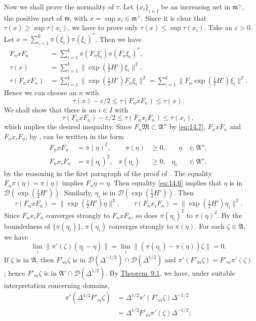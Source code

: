 \documentclass[12pt,b5paper,twoside]{article}
\theoremstyle{takesaki}
\numberwithin{equation}{section}
\begin{document}
Now we shall prove the normality of $\tau$.  Let $\{x_i\}_{i\in I}$
be an increasing net in $\mathfrak m^+$, the positive part of
$\mathfrak m$, with $x=\sup x_i\in\mathfrak m^+$.  Since it is clear
that $\tau(x)\geq\sup\tau(x_i)$, we have to prove only
$\tau(x)\leq\sup\tau(x_i)$.  Take an $\varepsilon>0$.  Let
$x=\sum_{i=1}^{k}\pi(\xi_i)\pi(\xi_i)^*$.  Then we have
\begin{align*}
 F_nxF_n&=\sum_{i=1}^{k}\pi(F_n\xi_i)\pi(F_n\xi_i)^*,\\
 \tau(x)&=\sum_{i=1}^{k}\|\exp(\tfrac12H')\xi_i\|^2,\\
 \tau(F_nxF_n)
 &=\sum_{i=1}^{k}\|\exp(\tfrac12H')F_n\xi_i\|^2
  =\sum_{i=1}^{k}\|F_n\exp(\tfrac12H')\xi_i\|^2.
\end{align*}
Hence we can choose an $n$ with
\[
  \tau(x)-\varepsilon/2\leq\tau(F_nxF_n)\leq\tau(x).
\]
We shall show that there is an $i\in I$ with
\[
 \tau(F_nxF_n)-\varepsilon/2
 \leq\tau(F_nx_iF_n)\leq\tau(x_i),
\]
which implies the desired inequality.  Since
$F_n\mathfrak M\subset\mathfrak A''$ by \eqref{eq:14.7},
$F_nxF_n$ and $F_nx_iF_n$, by , can be
written in the form
\[
 \begin{aligned}
  F_nxF_n&=\pi(\eta)^2,&\quad \pi(\eta)&\geq0,&\quad \eta&\in\mathfrak A'',\\
  F_nx_iF_n&=\pi(\eta_i)^2,& \pi(\eta_i)&\geq0,& \eta_i&\in\mathfrak A'',
 \end{aligned}
\]
by the reasoning in the first paragraph of the proof of
.  The equality $F_n\pi(\eta)=\pi(\eta)$ implies
$F_n\eta=\eta$.  Then equality \eqref{eq:14.6} implies that $\eta$ is
in $\mathcal D(\exp(\tfrac12H'))$.  Similarly, $\eta_i$ is in
$\mathcal D(\exp(\tfrac12H'))$.  Then
\[
 \tau(F_nxF_n)=\|\exp(\tfrac12H')\eta\|^2,
 \qquad
 \tau(F_nx_iF_n)=\|\exp(\tfrac12H')\eta_i\|^2.
\]
Since $F_nx_iF_n$ converges strongly to $F_nxF_n$, so does
$\pi(\eta_i)^2$ to $\pi(\eta)^2$.  By the boundedness of
$\{\pi(\eta_i)\}$, $\pi(\eta_i)$ converges strongly to $\pi(\eta)$.
For each $\zeta\in\mathfrak A$, we have
\[
 \lim_i\|\pi'(\zeta)(\eta_i-\eta)\|
 =\lim_i\|(\pi(\eta_i)-\pi(\eta))\zeta\|=0.
\]
If $\zeta$ is in $\mathfrak A$, then
$F'_m\zeta$ is in
$\mathcal D(\Delta^{-1/2})\cap\mathcal D(\Delta^{1/2})$ and
$\pi'(F'_m\zeta)=F'_m\pi'(\zeta)$; hence $F'_m\zeta$ is in
$\mathfrak A'\cap\mathcal D(\Delta^{1/2})$.  By
\hyperref[thm:9.1]{Theorem~9.1}, we have, under suitable
interpretation concerning domains,
\begin{align*}
 \pi'(\Delta^{1/2}F'_m\zeta)
 &=\Delta^{1/2}\pi'(F'_m\zeta)\Delta^{-1/2}\\
 &=\Delta^{1/2}F'_m\pi'(\zeta)\Delta^{-1/2};
\end{align*}
\end{document}

